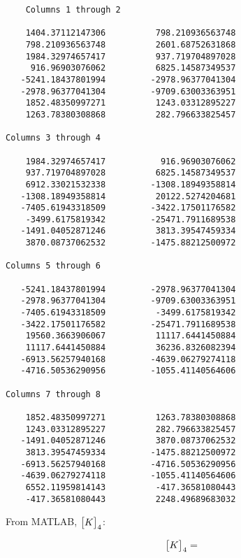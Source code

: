 \documentclass[../main.tex]{subfiles}
\begin{document}
\begin{verbatim}
    Columns 1 through 2

    1404.37112147306          798.210936563748
    798.210936563748          2601.68752631868
    1984.32974657417          937.719704897028
     916.96903076062          6825.14587349537
   -5241.18437801994         -2978.96377041304
   -2978.96377041304         -9709.63003363951
    1852.48350997271          1243.03312895227
    1263.78380308868          282.796633825457

Columns 3 through 4

    1984.32974657417           916.96903076062
    937.719704897028          6825.14587349537
    6912.33021532338         -1308.18949358814
   -1308.18949358814          20122.5274204681
   -7405.61943318509         -3422.17501176582
    -3499.6175819342         -25471.7911689538
   -1491.04052871246          3813.39547459334
    3870.08737062532         -1475.88212500972

Columns 5 through 6

   -5241.18437801994         -2978.96377041304
   -2978.96377041304         -9709.63003363951
   -7405.61943318509          -3499.6175819342
   -3422.17501176582         -25471.7911689538
    19560.3663906067          11117.6441450884
    11117.6441450884          36236.8326082394
   -6913.56257940168         -4639.06279274118
   -4716.50536290956         -1055.41140564606

Columns 7 through 8

    1852.48350997271          1263.78380308868
    1243.03312895227          282.796633825457
   -1491.04052871246          3870.08737062532
    3813.39547459334         -1475.88212500972
   -6913.56257940168         -4716.50536290956
   -4639.06279274118         -1055.41140564606
    6552.11959814143          -417.36581080443
    -417.36581080443          2248.49689683032
\end{verbatim}

From MATLAB, \(\mqty[K]_4\):

\[
    \mqty[K]_4 =  
\]
\end{document}
